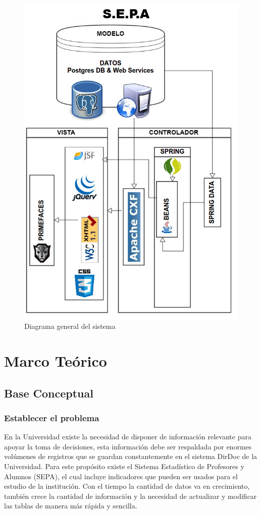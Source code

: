 \documentclass[a4paper,12pt,openany,oneside]{book}
\begin{document}
\begin{figure}[!hbp]
\begin{center}
\includegraphics[scale=0.6,angle=0]{images/diagrama.jpg}
\caption{Diagrama general del sistema}
\label{Diagrama general del sistema}
\end{center}
\end{figure}
\chapter{Marco Teórico}
\thispagestyle{empty}
\section{Base Conceptual}
\subsection{Establecer el problema}
En la Universidad existe la necesidad de disponer de información relevante para apoyar la toma de decisiones, esta información debe ser respaldada por enormes volúmenes de registros que se guardan constantemente en el sistema DirDoc de la Universidad. Para este propósito existe el Sistema Estadístico de Profesores y Alumnos (SEPA), el cual incluye indicadores que pueden ser usados para el estudio de la institución. Con el tiempo la cantidad de datos va en crecimiento, también crece la cantidad de información y la necesidad de actualizar y modificar las tablas de manera más rápida y sencilla.
\end{document}
